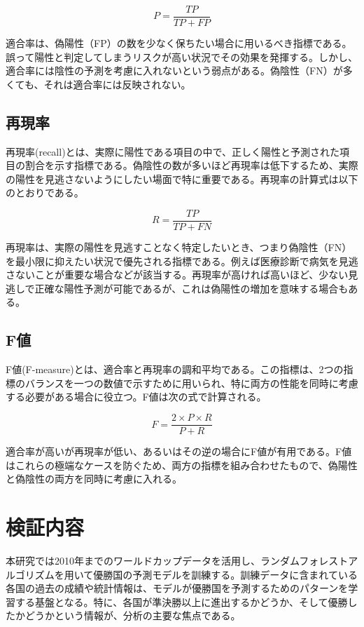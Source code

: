 \documentclass[platex]{suribt}
\begin{document}
\begin{equation}
  P = \frac{TP}{TP + FP}
\end{equation}


適合率は、偽陽性（FP）の数を少なく保ちたい場合に用いるべき指標である。誤って陽性と判定してしまうリスクが高い状況でその効果を発揮する。しかし、適合率には陰性の予測を考慮に入れないという弱点がある。偽陰性（FN）が多くても、それは適合率には反映されない。
\subsection{再現率}
再現率(recall)とは、実際に陽性である項目の中で、正しく陽性と予測された項目の割合を示す指標である。偽陰性の数が多いほど再現率は低下するため、実際の陽性を見逃さないようにしたい場面で特に重要である。再現率の計算式は以下のとおりである。

\begin{equation}
  R = \frac{TP}{TP + FN}
\end{equation}

再現率は、実際の陽性を見逃すことなく特定したいとき、つまり偽陰性（FN）を最小限に抑えたい状況で優先される指標である。例えば医療診断で病気を見逃さないことが重要な場合などが該当する。再現率が高ければ高いほど、少ない見逃しで正確な陽性予測が可能であるが、これは偽陽性の増加を意味する場合もある。
\subsection{F値}
F値(F-measure)とは、適合率と再現率の調和平均である。この指標は、2つの指標のバランスを一つの数値で示すために用いられ、特に両方の性能を同時に考慮する必要がある場合に役立つ。F値は次の式で計算される。

\begin{equation}
F = \frac{2 \times P \times R}{P + R}
\end{equation}

適合率が高いが再現率が低い、あるいはその逆の場合にF値が有用である。F値はこれらの極端なケースを防ぐため、両方の指標を組み合わせたもので、偽陽性と偽陰性の両方を同時に考慮に入れる。
\section{検証内容}
本研究では2010年までのワールドカップデータを活用し、ランダムフォレストアルゴリズムを用いて優勝国の予測モデルを訓練する。訓練データに含まれている各国の過去の成績や統計情報は、モデルが優勝国を予測するためのパターンを学習する基盤となる。特に、各国が準決勝以上に進出するかどうか、そして優勝したかどうかという情報が、分析の主要な焦点である。
\end{document}

